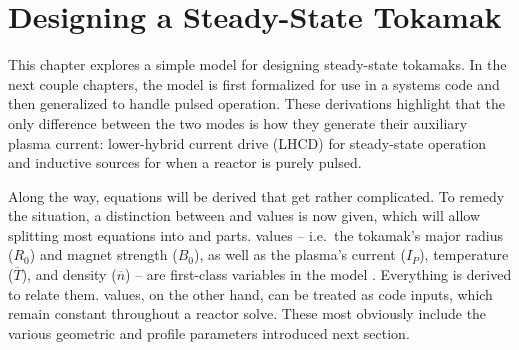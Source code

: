 %
%
%
%
%
%
%
%

\chapter{Designing a Steady-State Tokamak}

This chapter explores a simple model for designing steady-state tokamaks. In the next couple chapters, the model is first formalized for use in a systems code and then generalized to handle pulsed operation. These derivations highlight that the only difference between the two modes  is how they generate their auxiliary plasma current: lower-hybrid current drive (LHCD) for steady-state operation and inductive sources for when a reactor is purely pulsed.

Along the way, equations will be derived that get rather complicated. To remedy the situation, a distinction between  and  values is now given, which will allow splitting most equations into  and  parts.  values -- i.e.\ the tokamak's major radius ($R_0$) and magnet strength ($B_0$), as well as the plasma's current ($I_P$), temperature ($\overline T$), and density ($\overline n$) -- are first-class variables in the model . Everything is derived to relate them.  values, on the other hand, can be treated as code inputs, which remain constant throughout a reactor solve.  These most obviously include the various geometric and profile parameters introduced next section.


